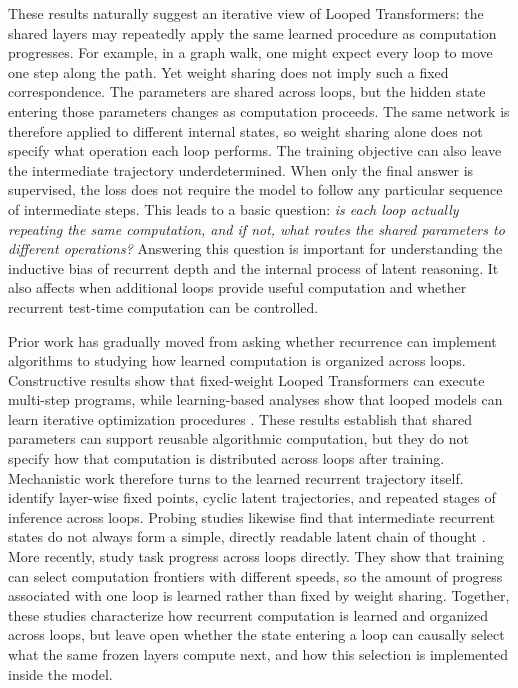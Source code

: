 \documentclass{article}
\begin{document}
These results naturally suggest an iterative view of Looped Transformers: the shared layers may repeatedly apply the same learned procedure as computation progresses.
For example, in a graph walk, one might expect every loop to move one step along the path.
Yet weight sharing does not imply such a fixed correspondence.
The parameters are shared across loops, but the hidden state entering those parameters changes as computation proceeds.
The same network is therefore applied to different internal states, so weight sharing alone does not specify what operation each loop performs.
The training objective can also leave the intermediate trajectory underdetermined.
When only the final answer is supervised, the loss does not require the model to follow any particular sequence of intermediate steps.
This leads to a basic question:
\emph{is each loop actually repeating the same computation, and if not, what routes the shared parameters to different operations?}
Answering this question is important for understanding the inductive bias of recurrent depth and the internal process of latent reasoning.
It also affects when additional loops provide useful computation and whether recurrent test-time computation can be controlled.

Prior work has gradually moved from asking whether recurrence can implement algorithms to studying how learned computation is organized across loops.
Constructive results show that fixed-weight Looped Transformers can execute multi-step programs, while learning-based analyses show that looped models can learn iterative optimization procedures \citep{giannou2023loops,yang2024learning,gatmiry2024gradient}.
These results establish that shared parameters can support reusable algorithmic computation, but they do not specify how that computation is distributed across loops after training.
Mechanistic work therefore turns to the learned recurrent trajectory itself.
\citet{blayney2026mechanistic} identify layer-wise fixed points, cyclic latent trajectories, and repeated stages of inference across loops.
Probing studies likewise find that intermediate recurrent states do not always form a simple, directly readable latent chain of thought \citep{lu2025probing}.
More recently, \citet{zhang2026recurrence} study task progress across loops directly.
They show that training can select computation frontiers with different speeds, so the amount of progress associated with one loop is learned rather than fixed by weight sharing.
Together, these studies characterize how recurrent computation is learned and organized across loops, but leave open whether the state entering a loop can causally select what the same frozen layers compute next, and how this selection is implemented inside the model.
\end{document}
